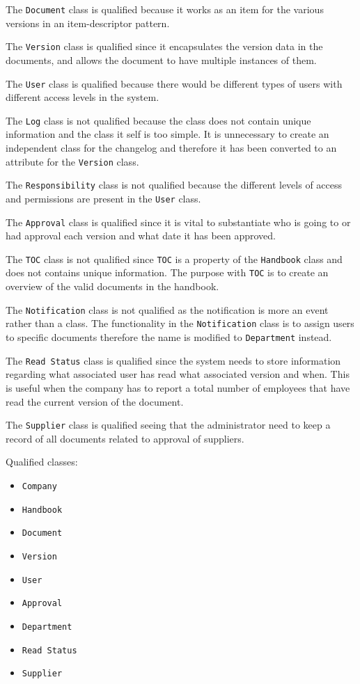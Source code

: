 The \texttt{Document} class is qualified because it works as an item for the various versions in an item-descriptor pattern.

The \texttt{Version} class is qualified since it encapsulates the version data in the documents, and allows the document to have multiple instances of them.

The \texttt{User} class is qualified because there would be different types of users with different access levels in the system.

The \texttt{Log} class is not qualified because the class does not contain unique information and the class it self is too simple.
It is unnecessary to create an independent class for the changelog and therefore it has been converted to an attribute for the \texttt{Version} class.

The \texttt{Responsibility} class is not qualified because the different levels of access and permissions are present in the \texttt{User} class.

The \texttt{Approval} class is qualified since it is vital to substantiate who is going to or had approval each version and what date it has been approved.

The \texttt{TOC} class is not qualified since \texttt{TOC} is a property of the \texttt{Handbook} class and does not contains unique information.
The purpose with \texttt{TOC} is to create an overview of the valid documents in the handbook.

The \texttt{Notification} class is not qualified as the notification is more an event rather than a class.
The functionality in the \texttt{Notification} class is to assign users to specific documents therefore the name is modified to \texttt{Department} instead.

The \texttt{Read Status} class is qualified since the system needs to store information regarding what associated user has read what associated version and when.
This is useful when the company has to report a total number of employees that have read the current version of the document.

The \texttt{Supplier} class is qualified seeing that the administrator need to keep a record of all documents related to approval of suppliers. 

Qualified classes:
\begin{itemize} 
	\item \texttt{Company}
	\item \texttt{Handbook}
	\item \texttt{Document}
	\item \texttt{Version}
	\item \texttt{User}
	\item \texttt{Approval}
	\item \texttt{Department}
	\item \texttt{Read Status}
	\item \texttt{Supplier}
\end{itemize}

